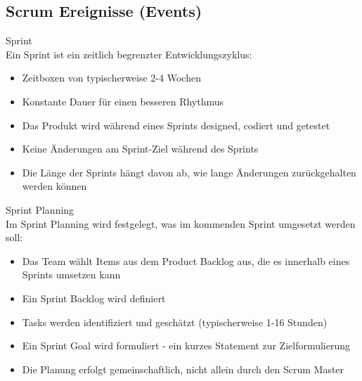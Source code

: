 \subsection{Scrum Ereignisse (Events)}

\begin{concept}{Sprint}\\
    Ein Sprint ist ein zeitlich begrenzter Entwicklungszyklus:
    \begin{itemize}
        \item Zeitboxen von typischerweise 2-4 Wochen
        \item Konstante Dauer für einen besseren Rhythmus
        \item Das Produkt wird während eines Sprints designed, codiert und getestet
        \item Keine Änderungen am Sprint-Ziel während des Sprints
        \item Die Länge der Sprints hängt davon ab, wie lange Änderungen zurückgehalten werden können
    \end{itemize}
\end{concept}

\begin{definition}{Sprint Planning}\\
    Im Sprint Planning wird festgelegt, was im kommenden Sprint umgesetzt werden soll:
    \begin{itemize}
        \item Das Team wählt Items aus dem Product Backlog aus, die es innerhalb eines Sprints umsetzen kann
        \item Ein Sprint Backlog wird definiert
        \item Tasks werden identifiziert und geschätzt (typischerweise 1-16 Stunden)
        \item Ein Sprint Goal wird formuliert - ein kurzes Statement zur Zielformulierung
        \item Die Planung erfolgt gemeinschaftlich, nicht allein durch den Scrum Master
    \end{itemize}
\end{definition}

